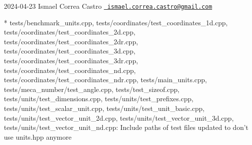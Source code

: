  2024-\/04-\/23 Ismael Correa Castro \href{mailto:ismael.correa.castro@gmail.com}{\texttt{ ismael.\+correa.\+castro@gmail.\+com}} \begin{DoxyVerb}* tests/benchmark_units.cpp,
tests/coordinates/test_coordinates_1d.cpp,
tests/coordinates/test_coordinates_2d.cpp,
tests/coordinates/test_coordinates_2dr.cpp,
tests/coordinates/test_coordinates_3d.cpp,
tests/coordinates/test_coordinates_3dr.cpp,
tests/coordinates/test_coordinates_nd.cpp,
tests/coordinates/test_coordinates_ndr.cpp, tests/main_units.cpp,
tests/meca_number/test_angle.cpp, tests/test_sizeof.cpp,
tests/units/test_dimensions.cpp, tests/units/test_prefixes.cpp,
tests/units/test_scalar_unit.cpp, tests/units/test_unit_basic.cpp,
tests/units/test_vector_unit_2d.cpp,
tests/units/test_vector_unit_3d.cpp,
tests/units/test_vector_unit_nd.cpp: Include paths of test files
updated to don't use units.hpp anymore
\end{DoxyVerb}
